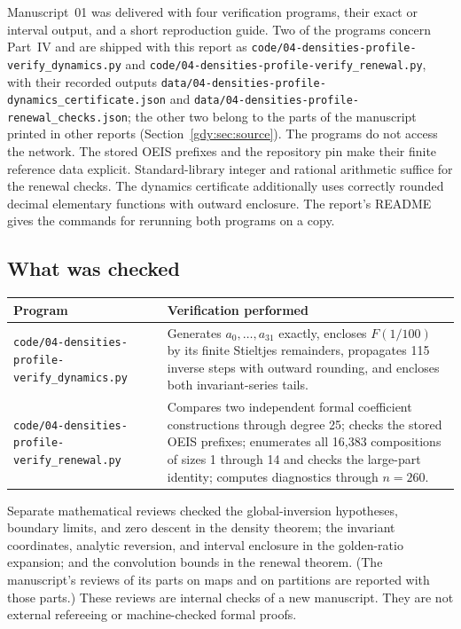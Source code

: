 \documentclass[11pt]{article}
\numberwithin{equation}{section}
\theoremstyle{definition}
\theoremstyle{remark}
\begin{document}
Manuscript~01 was delivered with four verification programs, their exact
or interval output, and a short reproduction guide. Two of the programs
concern Part~IV and are shipped with this report as
\nolinkurl{code/04-densities-profile-verify_dynamics.py} and
\nolinkurl{code/04-densities-profile-verify_renewal.py}, with their
recorded outputs
\nolinkurl{data/04-densities-profile-dynamics_certificate.json} and
\nolinkurl{data/04-densities-profile-renewal_checks.json}; the other two
belong to the parts of the manuscript printed in other reports
(Section~\ref{gdy:sec:source}). The programs do not access the network.
The stored OEIS prefixes and the repository pin make their finite
reference data explicit. Standard-library integer and rational arithmetic
suffice for the renewal checks. The dynamics certificate additionally
uses correctly rounded decimal elementary functions with outward
enclosure. The report's README gives the commands for rerunning both
programs on a copy.

\subsection{What was checked}

\begin{center}
\small
\begin{tabular}{@{}>{\raggedright\arraybackslash}p{}>{\raggedright\arraybackslash}p{}@{}}
\toprule
Program & Verification performed\\
\midrule
\nolinkurl{code/04-densities-profile-verify_dynamics.py}
& Generates $a_0,\ldots,a_{31}$ exactly, encloses $F(1/100)$ by its
finite Stieltjes remainders, propagates 115 inverse steps with outward
rounding, and encloses both invariant-series tails.\\[4pt]
\nolinkurl{code/04-densities-profile-verify_renewal.py}
& Compares two independent formal coefficient constructions through
degree 25; checks the stored OEIS prefixes; enumerates all 16,383
compositions of sizes 1 through 14 and checks the large-part identity;
computes diagnostics through $n=260$.\\
\bottomrule
\end{tabular}
\end{center}

Separate mathematical reviews checked the global-inversion hypotheses,
boundary limits, and zero descent in the density theorem; the invariant
coordinates, analytic reversion, and interval enclosure in the
golden-ratio expansion; and the convolution bounds in the renewal
theorem. (The manuscript's reviews of its parts on maps and on
partitions are reported with those parts.) These reviews are internal
checks of a new manuscript. They are not external refereeing or
machine-checked formal proofs.
\end{document}
